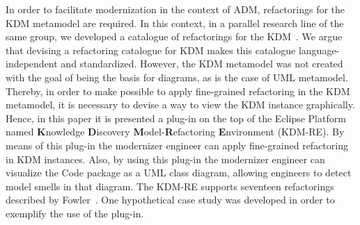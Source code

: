 In order to facilitate modernization in the context of ADM, refactorings for the KDM metamodel are required. In this context, in a parallel research line of the same group, we developed a catalogue of refactorings for the KDM~\cite{iri_catalogue_of_refactoring_2014}. We argue that devising a refactoring catalogue for KDM makes this catalogue language-independent and standardized. However, the KDM metamodel was not created with the goal of being the basis for diagrams, as is the case of UML metamodel. Thereby, in order to make possible to apply fine-grained refactoring in the KDM metamodel, it is necessary to devise a way to view the KDM instance graphically. 
%
%
Hence, in this paper it is presented a %
 plug-in on the top of the Eclipse Platform named  \textbf{K}nowledge \textbf{D}iscovery \textbf{M}odel-\textbf{R}efactoring \textbf{E}nvironment (KDM-RE). By means of this plug-in the modernizer engineer can apply fine-grained refactoring in KDM instances. Also, by using this plug-in the modernizer engineer can visualize the Code package as a UML class diagram, allowing engineers to detect model smells in that diagram. The KDM-RE supports seventeen refactorings described by Fowler~\cite{refactImpro}. One hypothetical case study was developed in order to exemplify the use of the plug-in.



